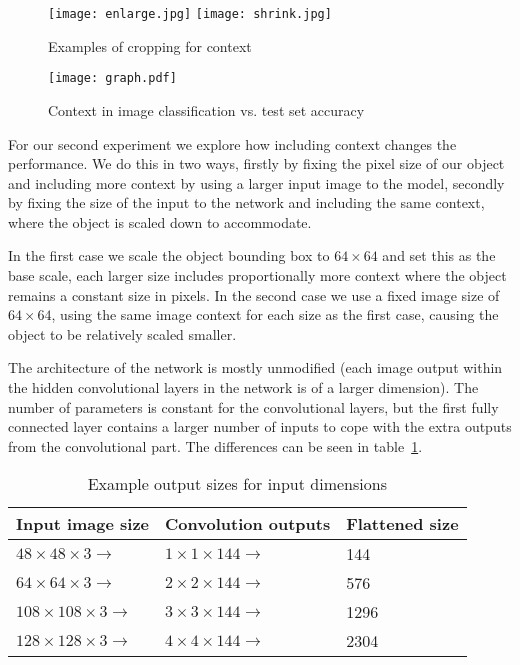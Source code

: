 \documentclass[conference]{IEEEtran}
\begin{document}
\begin{figure*}[t]
    \caption{Examples of cropping for context}
\centering
\texttt{[image: enlarge.jpg]}
\texttt{[image: shrink.jpg]}
\label{fig:context}
\end{figure*}




\begin{figure}[h]
    \caption{Context in image classification vs. test set accuracy}
\centering
\texttt{[image: graph.pdf]}
\label{fig:exp2}
\end{figure}

For our second experiment we explore how including context changes the performance. We do this in two ways, firstly by fixing the pixel size of our object and including more context by using a larger input image to the model, secondly by fixing the size of the input to the network and including the same context, where the object is scaled down to accommodate.

In the first case we scale the object bounding box to $ 64 \times 64 $ and set this as the base scale, each larger size includes proportionally more context where the object remains a constant size in pixels. In the second case we use a fixed image size of $ 64 \times 64 $, using the same image context for each size as the first case, causing the object to be relatively scaled smaller.

The architecture of the network is mostly unmodified (each image output within the hidden convolutional layers in the network is of a larger dimension). The number of parameters is constant for the convolutional layers, but the first fully connected layer contains a larger number of inputs to cope with the extra outputs from the convolutional part. The differences can be seen in table~\ref{fig:sizes}.


\begin{table}[h]
  \centering
    \caption{Example output sizes for input dimensions }
\begin{tabular}{ l l l } 
 
 \toprule
 Input image size & Convolution outputs & Flattened size \\
 \toprule
 
 $ 48 \times 48 \times 3 \rightarrow $ & $ 1\times1\times144 \rightarrow $ & 144 \\
 $ 64 \times 64 \times 3 \rightarrow $ & $ 2\times2\times144 \rightarrow $ & 576 \\
 $ 108 \times 108 \times 3 \rightarrow $ & $ 3\times3\times144 \rightarrow $ & 1296 \\
 $ 128 \times 128 \times 3 \rightarrow $ & $ 4\times4\times144 \rightarrow $ & 2304 \\
 
\end{tabular}
\label{fig:sizes}
\end{table}
\end{document}

